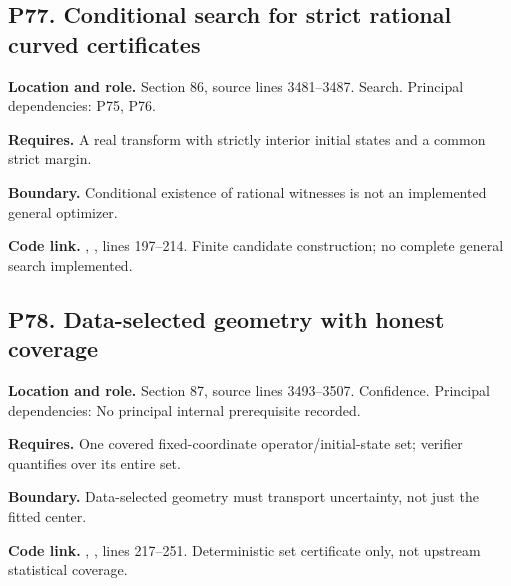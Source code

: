 \documentclass[11pt,letterpaper]{article}
\begin{document}
\par\noindent\begin{minipage}{\textwidth}
\subsection{P77. Conditional search for strict rational curved
certificates}\label{p77.-conditional-search-for-strict-rational-curved-certificates}

\textbf{Location and role.} Section 86, source lines 3481--3487. Search.
Principal dependencies: P75, P76.

\textbf{Requires.} A real transform with strictly interior initial
states and a common strict margin.

\textbf{Boundary.} Conditional existence of rational witnesses is not an
implemented general optimizer.

\textbf{Code link.} ,
, lines 197--214. Finite candidate
construction; no complete general search implemented.
\end{minipage}\par\medskip

\par\noindent\begin{minipage}{\textwidth}
\subsection{P78. Data-selected geometry with honest
coverage}\label{p78.-data-selected-geometry-with-honest-coverage}

\textbf{Location and role.} Section 87, source lines 3493--3507.
Confidence. Principal dependencies: No principal internal prerequisite
recorded.

\textbf{Requires.} One covered fixed-coordinate operator/initial-state
set; verifier quantifies over its entire set.

\textbf{Boundary.} Data-selected geometry must transport uncertainty,
not just the fitted center.

\textbf{Code link.} ,
, lines 217--251. Deterministic set
certificate only, not upstream statistical coverage.
\end{minipage}\par\medskip
\end{document}
